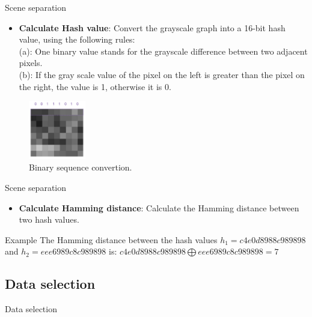 \documentclass[aspectratio=43,display]{beamer}
\begin{document}
			\begin{frame}{Scene separation}

				\begin{itemize}
					\item \textbf{Calculate Hash value}: Convert the grayscale graph into a 16-bit hash value, using the following rules:\\
					(a): One binary value stands for the grayscale difference between two adjacent pixels.\\
					(b): If the gray scale value of the pixel on the left is greater than the pixel on the right, the value is 1, otherwise it is 0.
				\end{itemize}

				\begin{figure}
					\includegraphics[width=2.5cm]{images/binary-sequence.png}
					\caption{\label{fig:Binary-Sequence}Binary sequence convertion.}
				\end{figure}
				
			\end{frame}

			\begin{frame}{Scene separation}

				\begin{itemize}
					\item \textbf{Calculate Hamming distance}: Calculate the Hamming distance between two hash values.
				\end{itemize}

				\begin{block}{Example}
					The Hamming distance between the hash values $h_1=c4e0d8988c989898$ and $h_2=eee6989c8c989898$ is:	
					$ c4e0d8988c989898 \bigoplus eee6989c8c989898 = 7 $
				\end{block}
			
			\end{frame}

		\subsection{Data selection}

			\begin{frame}{Data selection}
			\end{frame}
\end{document}
